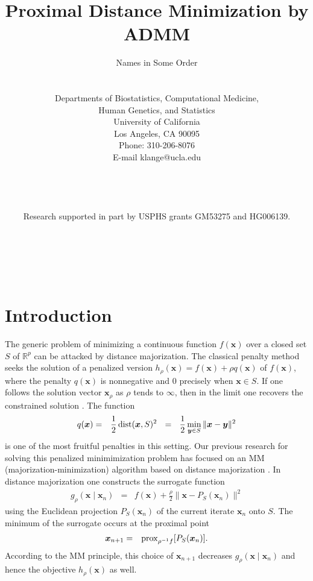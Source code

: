 \documentclass[11pt]{article}
\title{Proximal Distance Minimization by ADMM}
\author{Names in Some Order
\\
\\
\\
Departments of Biostatistics, Computational Medicine,\\
Human Genetics, and Statistics \\
University of California \\
Los Angeles, CA 90095\\
Phone: 310-206-8076 \\
E-mail klange@ucla.edu \\
\\
\\
\\
\\
Research supported in part by USPHS grants GM53275 and HG006139.}
\newcommand{\lvskip}{\vspace{.5in}}
\def\dist{\mathop{\rm dist}\nolimits}
\def\prox{\mathop{\rm prox}\nolimits}
\def\amp{\mathop{\;\:}\nolimits}
\newcommand{\bx}{\boldsymbol{x}}
\newcommand{\by}{\boldsymbol{y}}
\begin{document}
\maketitle

\noindent  \\ \\
\lvskip


\newpage
{}

\baselineskip=20pt

\section*{\center Introduction}

The generic problem of minimizing a continuous function $f(\bx)$ over 
a closed set $S$ of $\mathbb{R}^p$ can be attacked by distance majorization. The classical penalty method seeks the solution of a penalized version $h_\rho(\bx)=f(\bx)+\rho q(\bx)$ of $f(\bx)$, where
the penalty $q(\bx)$ is nonnegative and 0 precisely when $\bx \in S$. If one follows the solution vector $\bx_\rho$ as $\rho$ tends to 
$\infty$, then in the limit one recovers the constrained solution \cite{beltrami1970algorithmic,courant1943variational}. The
function 
\begin{eqnarray*}
q(\bx) & = & \frac{1}{2} \dist(\bx,S)^2 
\amp = \amp \frac{1}{2}\min_{\by \in S} \|\bx-\by\|^2
\end{eqnarray*}
is one of the most fruitful penalties in this setting. Our previous research for solving this penalized minimimization problem has focused on an MM (majorization-minimization) algorithm based on distance majorization \cite{lange2016mm}. In distance majorization one constructs the surrogate function
\begin{eqnarray*}
g_\rho(\bx \mid \bx_n) & = & f(\bx)+\frac{\rho}{2}
\|\bx-P_{S}(\bx_n)\|^2 
\end{eqnarray*}
using the Euclidean projection $P_S(\bx_n)$ of the current iterate 
$\bx_n$ onto $S$. The minimum of the surrogate occurs at the proximal point
\begin{eqnarray*}
\bx_{n+1} & = & \prox_{\rho^{-1}f}[P_S(\bx_n)].
\end{eqnarray*}
According to the MM principle, this choice of $\bx_{n+1}$ decreases
$g_\rho(\bx \mid \bx_n)$ and hence the objective $h_\rho(\bx)$ as well.
\end{document}
